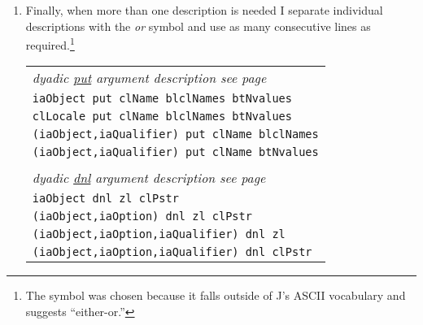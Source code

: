 \begin{enumerate}
\begin{center}
\begin{tabular}{ll}
\end{tabular} 
\end{center}
 \item Finally, when more than one description is needed I separate individual 
 descriptions with the \emph{or} symbol \argsep and use as many consecutive lines as required.\footnote{The \argsep symbol was chosen because it falls outside 
 of J's ASCII vocabulary and suggests ``either-or.''} 
  \begin{center}
 \footnotesize
\begin{tabular}{l}
 \textcolor{CodeComment}{\ttfamily\textsl{dyadic \hyperlink{il:put}{put} argument description see page~\pageref{ss:put}}} \\
 \texttt{iaObject put clName \argsep blclNames \argsep btNvalues} \\
 \texttt{clLocale put clName \argsep blclNames \argsep btNvalues} \\
 \texttt{(iaObject,iaQualifier) put clName \argsep blclNames}  \\
 \texttt{(iaObject,iaQualifier) put clName \argsep btNvalues} \\
 \\
  \textcolor{CodeComment}{\ttfamily\textsl{dyadic \hyperlink{il:dnl}{dnl} argument description see page~\pageref{ss:dnl}}} \\
 \texttt{iaObject dnl zl \argsep clPstr} \\
 \texttt{(iaObject,iaOption) dnl zl \argsep clPstr} \\
  \texttt{(iaObject,iaOption,iaQualifier) dnl zl } \\
  \texttt{(iaObject,iaOption,iaQualifier) dnl clPstr} \\
\end{tabular} 
\end{center}
\end{enumerate}
